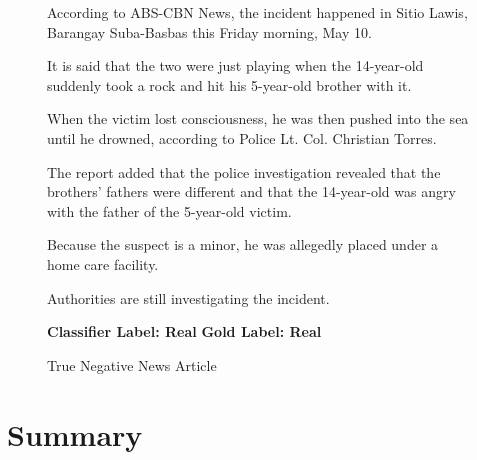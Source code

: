 \begin{figure}[h!]
{{                          \small \raggedright According to ABS-CBN News, the incident happened in Sitio Lawis, Barangay Suba-Basbas this Friday morning, May 10.\linebreak

                          \small \raggedright It is said that the two were just playing when the 14-year-old suddenly took a rock and hit his 5-year-old brother with it.\linebreak

                          \small \raggedright When the victim lost consciousness, he was then pushed into the sea until he drowned, according to Police Lt. Col. Christian Torres.\linebreak

                          \small \raggedright The report added that the police investigation revealed that the brothers' fathers were different and that the 14-year-old was angry with the father of the 5-year-old victim.\linebreak

                          \small \raggedright Because the suspect is a minor, he was allegedly placed under a home care facility.\linebreak

                          \small \raggedright Authorities are still investigating the incident.\linebreak
                            \linebreak\linebreak

                            \textbf{Classifier Label: Real} \newline
                            \textbf{Gold Label: Real}

                        }
                      }
                         \caption{True Negative News Article}
                            \label{fig:true-negative-news-article}
                        \end{figure}
\clearpage
\pagebreak
\section{Summary} \label{dataset-limitation}

